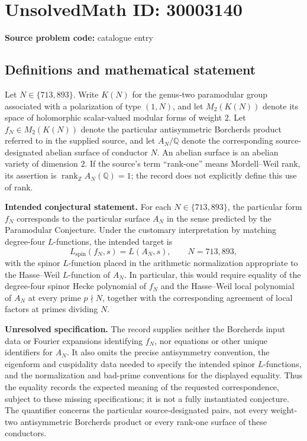 \documentclass[11pt]{article}
\newcommand{\Z}{\mathbb{Z}}
\newcommand{\Q}{\mathbb{Q}}
\begin{document}
\section*{UnsolvedMath ID: 30003140}
\textbf{Source problem code:} catalogue entry
\subsection{Definitions and mathematical statement}
Let \(N\in\{713,893\}\). Write \(K(N)\) for the genus-two paramodular group associated with a polarization of type \((1,N)\), and let \(M_2(K(N))\) denote its space of holomorphic scalar-valued modular forms of weight \(2\). Let \(f_N\in M_2(K(N))\) denote the particular antisymmetric Borcherds product referred to in the supplied source, and let \(A_N/\Q\) denote the corresponding source-designated abelian surface of conductor \(N\). An abelian surface is an abelian variety of dimension \(2\). If the source's term ``rank-one'' means Mordell--Weil rank, its assertion is \(\operatorname{rank}_{\Z} A_N(\Q)=1\); the record does not explicitly define this use of rank.

\textbf{Intended conjectural statement.} For each \(N\in\{713,893\}\), the particular form \(f_N\) corresponds to the particular surface \(A_N\) in the sense predicted by the Paramodular Conjecture. Under the customary interpretation by matching degree-four \(L\)-functions, the intended target is
\[
L_{\mathrm{spin}}(f_N,s)=L(A_N,s),
\qquad N=713,893,
\]
with the spinor \(L\)-function placed in the arithmetic normalization appropriate to the Hasse--Weil \(L\)-function of \(A_N\). In particular, this would require equality of the degree-four spinor Hecke polynomial of \(f_N\) and the Hasse--Weil local polynomial of \(A_N\) at every prime \(p\nmid N\), together with the corresponding agreement of local factors at primes dividing \(N\).

\textbf{Unresolved specification.} The record supplies neither the Borcherds input data or Fourier expansions identifying \(f_N\), nor equations or other unique identifiers for \(A_N\). It also omits the precise antisymmetry convention, the eigenform and cuspidality data needed to specify the intended spinor \(L\)-functions, and the normalization and bad-prime conventions for the displayed equality. Thus the equality records the expected meaning of the requested correspondence, subject to these missing specifications; it is not a fully instantiated conjecture. The quantifier concerns the particular source-designated pairs, not every weight-two antisymmetric Borcherds product or every rank-one surface of these conductors.
\end{document}
